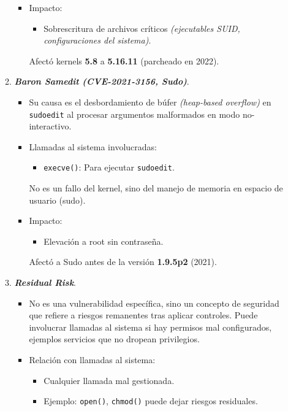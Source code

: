 \documentclass[12pt,letterpaper]{article}
\begin{document}
\begin{enumerate}
\begin{enumerate}[label=\arabic*)]
\begin{itemize}
    \item Impacto:
      \begin{itemize}
      \item Sobrescritura de archivos críticos \textit{(ejecutables SUID, configuraciones del sistema)}.
      \end{itemize}
      Afectó kernels \textbf{5.8} a \textbf{5.16.11} (parcheado en 2022).
    \end{itemize}
    
  \item \textbf{\textit{Baron Samedit (CVE-2021-3156, Sudo)}}.
    \begin{itemize}
    \item Su causa es el desbordamiento de búfer \textit{(heap-based overflow)} en \texttt{sudoedit} al procesar argumentos malformados en modo no-interactivo.
      
    \item Llamadas al sistema involucradas:
      \begin{itemize}
      \item \texttt{execve()}: Para ejecutar \texttt{sudoedit}.
      \end{itemize}
      No es un fallo del kernel, sino del manejo de memoria en espacio de usuario (sudo).
      
    \item Impacto:
      \begin{itemize}
      \item Elevación a root sin contraseña.
      \end{itemize}
      Afectó a Sudo antes de la versión \textbf{1.9.5p2} (2021).
    \end{itemize}

  \item \textbf{\textit{Residual Risk}}.
    \begin{itemize}
    \item No es una vulnerabilidad específica, sino un concepto de seguridad que refiere a riesgos remanentes tras aplicar controles. Puede involucrar llamadas al sistema si hay permisos mal configurados, ejemplos servicios que no dropean privilegios.
      
    \item Relación con llamadas al sistema:
      \begin{itemize}
      \item Cualquier llamada mal gestionada.
      \item Ejemplo: \texttt{open()}, \texttt{chmod()} puede dejar riesgos residuales.
      \end{itemize}
      

\end{itemize}
\end{enumerate}
\end{enumerate}
\end{document}
